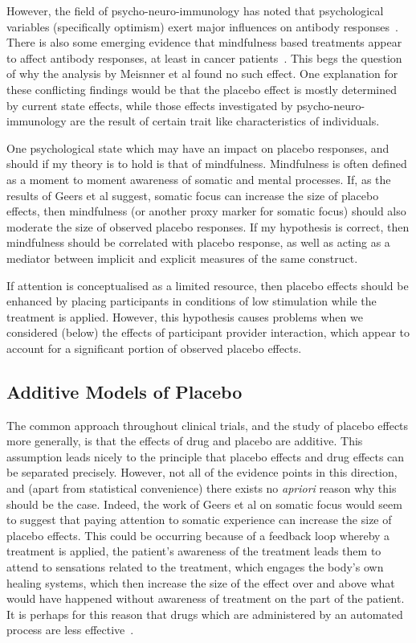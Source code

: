 However, the field of psycho-neuro-immunology has noted that psychological variables (specifically optimism) exert major influences on antibody responses~\cite{Carver2010}. There is also some emerging evidence that mindfulness based treatments appear to affect antibody responses, at least in cancer patients~\cite{Ledesma2009}. This begs the question of why the analysis by Meisnner et al found no such effect. One explanation for these conflicting findings would be that the placebo effect is mostly determined by current state effects, while those effects investigated by psycho-neuro-immunology are the result of certain trait like characteristics of individuals.  

One psychological state which may have an impact on placebo responses, and should if my theory is to hold is that of mindfulness. Mindfulness is often defined as a moment to moment awareness of somatic and mental processes. If, as the results of Geers et al suggest, somatic focus can increase the size of placebo effects, then mindfulness (or another proxy marker for somatic focus) should also moderate the size of observed placebo responses. If my hypothesis is correct, then mindfulness should be correlated with placebo response, as well as acting as a mediator between implicit and explicit measures of the same construct. 

If attention is conceptualised as a limited resource, then placebo effects should be enhanced by placing participants in conditions of low stimulation while the treatment is applied. However, this hypothesis causes problems when we considered (below) the effects of participant provider interaction, which appear to account for a significant portion of observed placebo effects. 

\subsection{Additive Models of Placebo}

The common approach throughout clinical trials, and the study of placebo effects more generally, is that the effects of drug and placebo are additive. This assumption leads nicely to the principle that placebo effects and drug effects can be separated precisely. However, not all of the evidence points in this direction, and (apart from statistical convenience) there exists no 
{\it apriori\/} reason why this should be the case. Indeed, the work of Geers et al on somatic focus would seem to suggest that paying attention to somatic experience can increase the size of placebo effects. This could be occurring because of a feedback loop whereby a treatment is applied, the patient's awareness of the treatment leads them to attend to sensations related to the treatment, which engages the body's own healing systems, which then increase the size of the effect over and above what would have happened without awareness of treatment on the part of the patient. It is perhaps for this reason that drugs which are administered by an automated process are less effective~\cite{benedetti2003}. 

